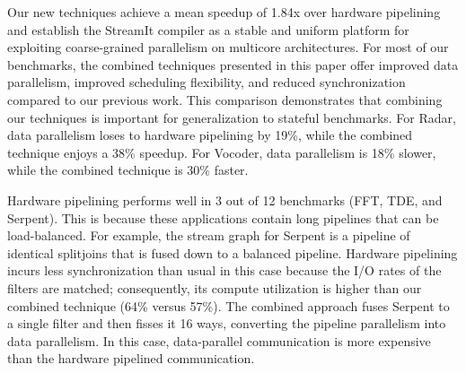 Our new techniques achieve a mean speedup of 1.84x over hardware
pipelining and establish the StreamIt compiler as a stable and uniform
platform for exploiting coarse-grained parallelism on multicore
architectures. For most of our benchmarks, the combined techniques
presented in this paper offer improved data parallelism, improved
scheduling flexibility, and reduced synchronization compared to our
previous work. This comparison demonstrates that combining our
techniques is important for generalization to stateful benchmarks.
For Radar, data parallelism loses to hardware pipelining by 19\%,
while the combined technique enjoys a 38\% speedup. For Vocoder, data
parallelism is 18\% slower, while the combined technique is 30\%
faster.

Hardware pipelining performs well in 3 out of 12 benchmarks (FFT, TDE,
and Serpent). This is because these applications contain long
pipelines that can be load-balanced.  For example, the stream graph
for Serpent is a pipeline of identical splitjoins that is fused down
to a balanced pipeline. Hardware pipelining incurs less
synchronization than usual in this case because the I/O rates of the
filters are matched; consequently, its compute utilization is higher
than our combined technique (64\% versus 57\%).  The combined approach
fuses Serpent to a single filter and then fisses it 16 ways,
converting the pipeline parallelism into data parallelism.  In this
case, data-parallel communication is more expensive than the hardware
pipelined communication.







